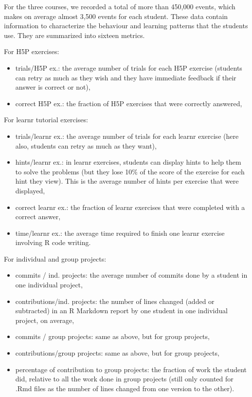 \documentclass[
]{article}
\providecommand{\tightlist}{%
  \setlength{\itemsep}{0pt}\setlength{\parskip}{0pt}}
\begin{document}
For the three courses, we recorded a total of more than 450,000 events,
which makes on average almost 3,500 events for each student. These data
contain information to characterize the behaviour and learning patterns
that the students use. They are summarized into sixteen metrics.

For H5P exercises:

\begin{itemize}
\tightlist
\item
  trials/H5P ex.: the average number of trials for each H5P exercise
  (students can retry as much as they wish and they have immediate
  feedback if their answer is correct or not),
\item
  correct H5P ex.: the fraction of H5P exercises that were correctly
  answered,
\end{itemize}

For learnr tutorial exercises:

\begin{itemize}
\tightlist
\item
  trials/learnr ex.: the average number of trials for each learnr
  exercise (here also, students can retry as much as they want),
\item
  hints/learnr ex.: in learnr exercises, students can display hints to
  help them to solve the problems (but they lose 10\% of the score of
  the exercise for each hint they view). This is the average number of
  hints per exercise that were displayed,
\item
  correct learnr ex.: the fraction of learnr exercises that were
  completed with a correct answer,
\item
  time/learnr ex.: the average time required to finish one learnr
  exercise involving R code writing.
\end{itemize}

For individual and group projects:

\begin{itemize}
\tightlist
\item
  commits / ind. projects: the average number of commits done by a
  student in one individual project,
\item
  contributions/ind. projects: the number of lines changed (added or
  subtracted) in an R Markdown report by one student in one individual
  project, on average,
\item
  commits / group projects: same as above, but for group projects,
\item
  contributions/group projects: same as above, but for group projects,
\item
  percentage of contribution to group projects: the fraction of work the
  student did, relative to all the work done in group projects (still
  only counted for .Rmd files as the number of lines changed from one
  version to the other).
\end{itemize}
\end{document}
